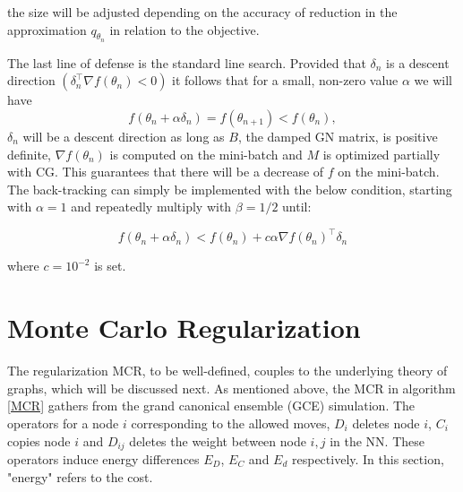 \noindent
the size will be adjusted depending on the accuracy of reduction in the approximation $q_{\theta_n}$ in relation to the objective. 

The last line of defense is the standard line search. Provided that $\delta_n$ is a descent direction $(\delta_n^\intercal \nabla f(\theta_n) < 0)$ it follows that for a small, non-zero value $\alpha$ we will have \[f(\theta_n + \alpha \delta_n) = f(\theta_{n+1}) < f(\theta_n),\] $\delta_n$ will be a descent direction as long as $B$, the damped GN matrix, is positive definite, $\nabla f(\theta_n)$ is computed on the mini-batch and $M$ is optimized partially with CG\cite{Martens2012}. This guarantees that there will be a decrease of $f$ on the mini-batch. The back-tracking can simply be implemented with the below condition, starting with $\alpha = 1$ and repeatedly multiply with $\beta = 1/2$ until:

\[f(\theta_n + \alpha \delta_n) < f(\theta_n) + c \alpha \nabla f(\theta_n)^\intercal \delta_n\]

where $c = 10^{-2}$ is set.

\section{Monte Carlo Regularization}

The regularization MCR, to be well-defined, couples to the underlying theory of graphs, which will be discussed next. As mentioned above, the MCR in algorithm \ref{MCR} gathers from the grand canonical ensemble (GCE) simulation. The operators for a node $i$ corresponding to the allowed moves, $D_i$ deletes node $i$, $C_i$ copies node $i$ and $D_{ij}$ deletes the weight between node $i,j$ in the NN. These operators induce energy differences $E_D$, $E_C$ and $E_d$ respectively. In this section, "energy" refers to the cost.


